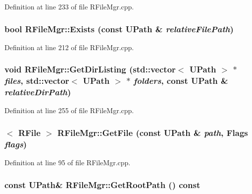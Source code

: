 Definition at line 233 of file RFileMgr.cpp.\hypertarget{class_r_file_mgr_e8ab22a950ebce68e26d4372c42e36bc}{
\subsubsection[{Exists}]{\setlength{\rightskip}{0pt plus 5cm}bool RFileMgr::Exists (const {\bf UPath} \& {\em relativeFilePath})}}
\label{class_r_file_mgr_e8ab22a950ebce68e26d4372c42e36bc}




Definition at line 212 of file RFileMgr.cpp.\hypertarget{class_r_file_mgr_d807748b4fb7900de77813bd6a7a64cd}{
\subsubsection[{GetDirListing}]{\setlength{\rightskip}{0pt plus 5cm}void RFileMgr::GetDirListing (std::vector$<$ {\bf UPath} $>$ $\ast$ {\em files}, \/  std::vector$<$ {\bf UPath} $>$ $\ast$ {\em folders}, \/  const {\bf UPath} \& {\em relativeDirPath})}}
\label{class_r_file_mgr_d807748b4fb7900de77813bd6a7a64cd}




Definition at line 255 of file RFileMgr.cpp.\hypertarget{class_r_file_mgr_d7f101aeebcb703282cfcb6c8eba67f9}{
\subsubsection[{GetFile}]{$<$ {\bf RFile} $>$ RFileMgr::GetFile (const {\bf UPath} \& {\em path}, \/  {\bf Flags} {\em flags})}}
\label{class_r_file_mgr_d7f101aeebcb703282cfcb6c8eba67f9}




Definition at line 95 of file RFileMgr.cpp.\hypertarget{class_r_file_mgr_0027774c5d4091aa024df4ff8aa61cfa}{
\subsubsection[{GetRootPath}]{\setlength{\rightskip}{0pt plus 5cm}const {\bf UPath}\& RFileMgr::GetRootPath () const}}
\label{class_r_file_mgr_0027774c5d4091aa024df4ff8aa61cfa}





